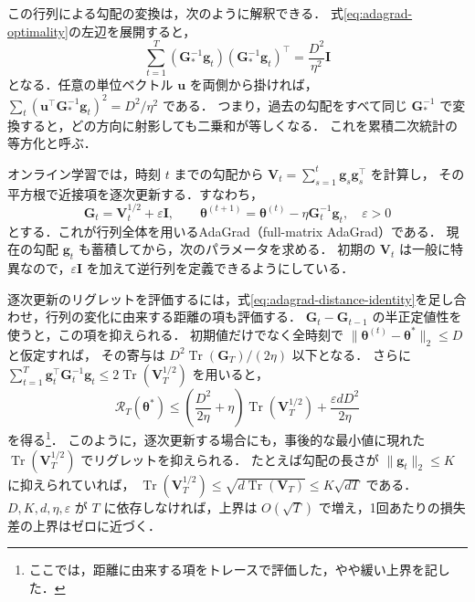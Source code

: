 \documentclass[../main.tex]{subfiles}
\begin{document}
この行列による勾配の変換は，次のように解釈できる．
式\eqref{eq:adagrad-optimality}の左辺を展開すると，
\begin{equation}
  \sum_{t=1}^T
  (\bm{G}_*^{-1}\bm{g}_t)(\bm{G}_*^{-1}\bm{g}_t)^\top
  =\frac{D^2}{\eta^2}\bm{I}
  \label{eq:adagrad-isotropy}
\end{equation}
となる．任意の単位ベクトル $\bm{u}$ を両側から掛ければ，
$\sum_t(\bm{u}^\top\bm{G}_*^{-1}\bm{g}_t)^2=D^2/\eta^2$ である．
つまり，過去の勾配をすべて同じ $\bm{G}_*^{-1}$ で変換すると，どの方向に射影しても二乗和が等しくなる．
これを累積二次統計の等方化と呼ぶ．

オンライン学習では，時刻 $t$ までの勾配から $\bm{V}_t=\sum_{s=1}^t\bm{g}_s\bm{g}_s^\top$ を計算し，
その平方根で近接項を逐次更新する．すなわち，
\begin{equation}
  \bm{G}_t=\bm{V}_t^{1/2}+\varepsilon\bm{I},
  \qquad
  \bm{\theta}^{(t+1)}
  =\bm{\theta}^{(t)}-\eta\bm{G}_t^{-1}\bm{g}_t,
  \quad\varepsilon>0
  \label{eq:adagrad-full-update}
\end{equation}
とする．これが行列全体を用いるAdaGrad（full-matrix AdaGrad）である．
現在の勾配 $\bm{g}_t$ も蓄積してから，次のパラメータを求める．
初期の $\bm{V}_t$ は一般に特異なので，$\varepsilon\bm{I}$ を加えて逆行列を定義できるようにしている．

逐次更新のリグレットを評価するには，式\eqref{eq:adagrad-distance-identity}を足し合わせ，行列の変化に由来する距離の項も評価する．
$\bm{G}_t-\bm{G}_{t-1}$ の半正定値性を使うと，この項を抑えられる．
初期値だけでなく全時刻で $\|\bm{\theta}^{(t)}-\bm{\theta}^*\|_2\leq D$ と仮定すれば，
その寄与は $D^2\operatorname{Tr}(\bm{G}_T)/(2\eta)$ 以下となる．
さらに $\sum_{t=1}^T\bm{g}_t^\top\bm{G}_t^{-1}\bm{g}_t\leq2\operatorname{Tr}(\bm{V}_T^{1/2})$ を用いると，
\begin{equation}
  \mathcal{R}_T(\bm{\theta}^*)
  \leq\left(\frac{D^2}{2\eta}+\eta\right)
  \operatorname{Tr}(\bm{V}_T^{1/2})
  +\frac{\varepsilon dD^2}{2\eta}
  \label{eq:adagrad-adaptive-regret}
\end{equation}
を得る\cite{duchi2011adagrad}\footnote{ここでは，距離に由来する項をトレースで評価した，やや緩い上界を記した．}．
このように，逐次更新する場合にも，事後的な最小値に現れた $\operatorname{Tr}(\bm{V}_T^{1/2})$ でリグレットを抑えられる．
たとえば勾配の長さが $\|\bm{g}_t\|_2\leq K$ に抑えられていれば，
$\operatorname{Tr}(\bm{V}_T^{1/2})\leq\sqrt{d\operatorname{Tr}(\bm{V}_T)}\leq K\sqrt{dT}$ である．
$D,K,d,\eta,\varepsilon$ が $T$ に依存しなければ，上界は $O(\sqrt{T})$ で増え，1回あたりの損失差の上界はゼロに近づく．
\end{document}
